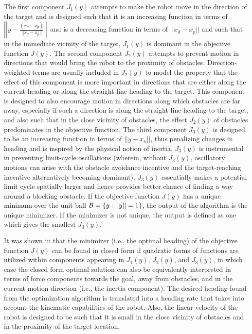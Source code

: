 The first component $J_1(y)$ attempts to make the robot move in the direction of the target and is designed such that it is an increasing function in terms of 
$\left|\left| y-\frac{(x_d-x_p)}{||x_d-x_p||}\right|\right|$ 
and is a decreasing function in terms of 
$||x_d-x_p||$
and such that in the immediate vicinity of the target, $J_1(y)$ is dominant in the objective function $J(y)$.
The second component $J_2(y)$ attempts to prevent motion in directions that would bring the robot to the proximity of obstacles. Direction-weighted terms \cite{KK05b_jirs} are usually included in $J_2(y)$ to model the property that the effect of this component is more important in directions that are either along the current heading or along the straight-line heading to the target. This component is designed to also encourage motion in directions along which obstacles are far away, especially if such a direction is along the straight-line heading to the target, and also such that in the close vicinity of obstacles, the effect $J_2(y)$ of obstacles predominates in the objective function. The third component $J_3(y)$ is designed to be an increasing function in terms of
$||y-x_h||$, thus penalizing changes in heading and is inspired by the physical notion of inertia. $J_3(y)$ is instrumental in preventing limit-cycle oscillations (wherein, without $J_3(y)$, oscillatory motions can arise with the obstacle avoidance incentive and the target-reaching incentive alternatively becoming dominant). $J_3(y)$ essentially makes a potential limit cycle spatially larger and hence provides better chance of finding a way around a blocking obstacle. If the objective function $J(y)$ has a unique minimum over the unit ball ${\cal B}=\{y:||y||=1\}$, the output of the algorithm is the unique minimizer.  If the minimizer is not unique, the output is defined as one which gives the smallest $J_3(y)$.   

It was shown in \cite{KK05b_jirs} that the minimizer (i.e., the optimal heading) of the objective function $J(y)$ can be found in closed form if quadratic forms of functions are utilized within components appearing in $J_1(y)$, $J_2(y)$, and $J_3(y)$, in which case the closed form optimal solution can also be equivalently interpreted in terms of force components towards the goal, away from obstacles, and in the current motion direction (i.e., the inertia component).
The desired heading found from the optimization algorithm is translated into a heading rate that takes into account the kinematic capabilities of the robot. Also, the linear velocity of the robot is designed to be such that it is small in the close vicinity of obstacles and in the proximity of the target location.  

